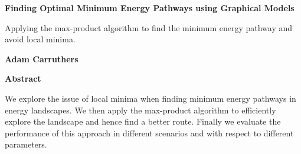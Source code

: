 
\begin{titlepage}
    \thispagestyle{plain}
    \begin{center}
        \vspace*{1cm}
        \Large
        \textbf{Finding Optimal Minimum Energy Pathways using Graphical Models}

        \vspace{0.4cm}
        \large
        Applying the max-product algorithm to find the minimum energy pathway and avoid local minima.

        \vspace{0.4cm}
        \textbf{Adam Carruthers}

        \vspace{0.9cm}
        \textbf{Abstract}
    \end{center}
    We explore the issue of local minima when finding minimum energy pathways in energy landscapes.
    We then apply the max-product algorithm to efficiently explore the landscape and hence find a better route.
    Finally we evaluate the performance of this approach in different scenarios and with respect to different parameters.
\end{titlepage}